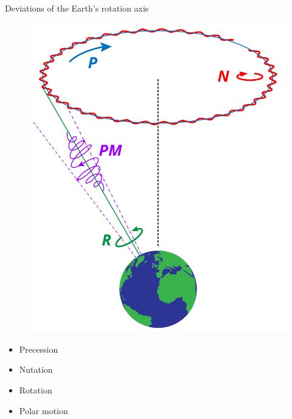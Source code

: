 \documentclass{beamer} %
\begin{document}
\begin{frame}{Deviations of the Earth's rotation axis}
  \begin{minipage}{0.49\textwidth}
    \begin{figure}
      \centering
      \includegraphics[width=\textwidth]{../Images/precession_nutation.pdf}
    \end{figure}
  \end{minipage}
  \begin{minipage}{0.49\textwidth}
    \begin{itemize}
      \item \textcolor[RGB]{0,113,188}{{Precession}}
      \item \textcolor[RGB]{255,0,0}{{Nutation}}
      \item \textcolor[RGB]{0,146,70}{{Rotation}}
      \item \textcolor[RGB]{158,0,255}{{Polar motion}}
    \end{itemize}
  \end{minipage}
\end{frame}
\end{document}
